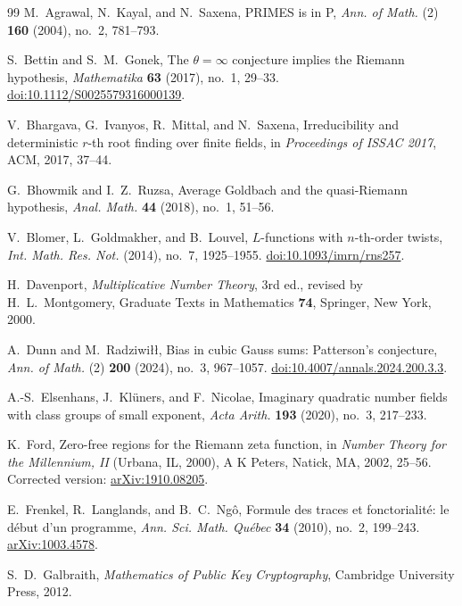 \begin{thebibliography}{99}
M.~Agrawal, N.~Kayal, and N.~Saxena,
PRIMES is in P,
\emph{Ann. of Math.} (2) \textbf{160} (2004), no.~2, 781--793.

S.~Bettin and S.~M.~Gonek,
The $\theta=\infty$ conjecture implies the Riemann hypothesis,
\emph{Mathematika} \textbf{63} (2017), no.~1, 29--33.
\href{https://doi.org/10.1112/S0025579316000139}
{doi:10.1112/S0025579316000139}.

V.~Bhargava, G.~Ivanyos, R.~Mittal, and N.~Saxena,
Irreducibility and deterministic $r$-th root finding over finite fields,
in \emph{Proceedings of ISSAC 2017}, ACM, 2017, 37--44.

G.~Bhowmik and I.~Z.~Ruzsa,
Average Goldbach and the quasi-Riemann hypothesis,
\emph{Anal. Math.} \textbf{44} (2018), no.~1, 51--56.

V.~Blomer, L.~Goldmakher, and B.~Louvel,
$L$-functions with $n$-th-order twists,
\emph{Int. Math. Res. Not.} (2014), no.~7, 1925--1955.
\href{https://doi.org/10.1093/imrn/rns257}
{doi:10.1093/imrn/rns257}.

H.~Davenport,
\emph{Multiplicative Number Theory}, 3rd ed., revised by
H.~L.~Montgomery, Graduate Texts in Mathematics \textbf{74},
Springer, New York, 2000.

A.~Dunn and M.~Radziwi\l\l,
Bias in cubic Gauss sums: Patterson's conjecture,
\emph{Ann. of Math.} (2) \textbf{200} (2024), no.~3, 967--1057.
\href{https://doi.org/10.4007/annals.2024.200.3.3}
{doi:10.4007/annals.2024.200.3.3}.

A.-S.~Elsenhans, J.~Kl\"uners, and F.~Nicolae,
Imaginary quadratic number fields with class groups of small exponent,
\emph{Acta Arith.} \textbf{193} (2020), no.~3, 217--233.

K.~Ford,
Zero-free regions for the Riemann zeta function,
in \emph{Number Theory for the Millennium, II} (Urbana, IL, 2000),
A K Peters, Natick, MA, 2002, 25--56.
Corrected version: \href{https://arxiv.org/abs/1910.08205}
{arXiv:1910.08205}.

E.~Frenkel, R.~Langlands, and B.~C.~Ng\^o,
Formule des traces et fonctorialit\'e: le d\'ebut d'un programme,
\emph{Ann. Sci. Math. Qu\'ebec} \textbf{34} (2010), no.~2, 199--243.
\href{https://arxiv.org/abs/1003.4578}{arXiv:1003.4578}.

S.~D.~Galbraith,
\emph{Mathematics of Public Key Cryptography},
Cambridge University Press, 2012.


\end{thebibliography}
